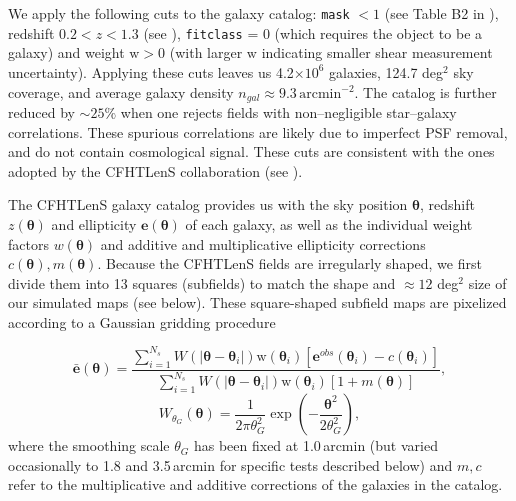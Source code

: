 \documentclass[reprint,aps,prd,superscriptaddress,showkeys,showpacs]{revtex4-1}
\begin{document}
We apply the following cuts to the galaxy catalog: \texttt{mask} $<1$ (see
Table B2 in \citep{SExtractor}), redshift $0.2 < z < 1.3$ (see
\citep{cfht1}), \texttt{fitclass} = 0 (which requires the object to be a
galaxy) and weight $\mathrm{w}>0$ (with larger $\mathrm{w}$ indicating
smaller shear measurement uncertainty). Applying these cuts leaves us
4.2$\times10^6$ galaxies, 124.7 deg$^2$ sky coverage, and average
galaxy density $n_{gal} \approx 9.3\,\mathrm{arcmin}^{-2}$. The
catalog is further reduced by $\sim25\%$ when one rejects fields with
non--negligible star--galaxy correlations. These spurious correlations
are likely due to imperfect PSF removal, and do not contain
cosmological signal. These cuts are consistent with the ones adopted
by the CFHTLenS collaboration (see \citep{CFHTFu}). 


The CFHTLenS galaxy catalog provides us with the sky position
$\pmb{\theta}$, redshift $z(\pmb{\theta})$ and ellipticity
$\mathbf{e}(\pmb{\theta})$ of each galaxy, as well as the individual
weight factors $w(\pmb{\theta})$ and additive and multiplicative
ellipticity corrections $c(\pmb{\theta}), m(\pmb{\theta})$. Because
the CFHTLenS fields are irregularly shaped, we first divide them into
13 squares (subfields) to match the shape and $\approx12$ deg$^2$ size
of our simulated maps (see below). These square-shaped subfield maps
are pixelized according to a Gaussian gridding procedure

\begin{equation}
\bar{\mathbf{e}}(\pmb{\theta}) = \frac{\sum_{i=1}^{N_s} W(\vert\pmb{\theta}-\pmb{\theta}_i\vert)\mathrm{w}(\pmb{\theta}_i)[\mathbf{e}^{obs}(\pmb{\theta}_i)-c(\pmb{\theta}_i)]}{\sum_{i=1}^{N_s}W(\vert\pmb{\theta}-\pmb{\theta}_i\vert)\mathrm{w}(\pmb{\theta}_i)[1+m(\pmb{\theta})]},
\end{equation} 
\begin{equation}
\label{gausskernel}
W_{\theta_G}(\pmb{\theta}) = \frac{1}{2\pi\theta_G^2}\exp{\left(-\frac{\pmb{\theta}^2}{2\theta_G^2}\right)},
\end{equation}
where the smoothing scale $\theta_G$ has been fixed at 1.0\,arcmin
(but varied occasionally to 1.8 and 3.5\,arcmin for specific tests
described below) and $m,c$ refer to the multiplicative and additive
corrections of the galaxies in the catalog. 
\end{document}
